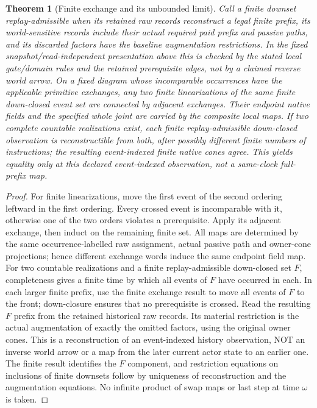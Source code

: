 \documentclass{article}
\newtheorem{theorem}{Theorem}
\begin{document}
\begin{theorem}[Finite exchange and its unbounded limit]\label{thm:exchange}
Call a finite downset replay-admissible when its retained raw records reconstruct a legal finite prefix, its world-sensitive records include their actual required paid prefix and passive paths, and its discarded factors have the baseline augmentation restrictions. In the fixed snapshot/read-independent presentation above this is checked by the stated local gate/domain rules and the retained prerequisite edges, not by a claimed reverse world arrow. On a fixed diagram whose incomparable occurrences have the applicable primitive exchanges, any two finite linearizations of the same finite down-closed event set are connected by adjacent exchanges. Their endpoint native fields and the specified whole joint are carried by the composite local maps. If two complete countable realizations exist, each finite replay-admissible down-closed observation is reconstructible from both, after possibly different finite numbers of instructions; the resulting event-indexed finite native cones agree. This yields equality only at this declared event-indexed observation, not a same-clock full-prefix map.
\end{theorem}
\begin{proof}
For finite linearizations, move the first event of the second ordering leftward in the first ordering. Every crossed event is incomparable with it, otherwise one of the two orders violates a prerequisite. Apply its adjacent exchange, then induct on the remaining finite set. All maps are determined by the same occurrence-labelled raw assignment, actual passive path and owner-cone projections; hence different exchange words induce the same endpoint field map. For two countable realizations and a finite replay-admissible down-closed set $F$, completeness gives a finite time by which all events of $F$ have occurred in each. In each larger finite prefix, use the finite exchange result to move all events of $F$ to the front; down-closure ensures that no prerequisite is crossed. Read the resulting $F$ prefix from the retained historical raw records. Its material restriction is the actual augmentation of exactly the omitted factors, using the original owner cones. This is a reconstruction of an event-indexed history observation, NOT an inverse world arrow or a map from the later current actor state to an earlier one. The finite result identifies the $F$ component, and restriction equations on inclusions of finite downsets follow by uniqueness of reconstruction and the augmentation equations. No infinite product of swap maps or last step at time $\omega$ is taken.
\end{proof}
\end{document}

